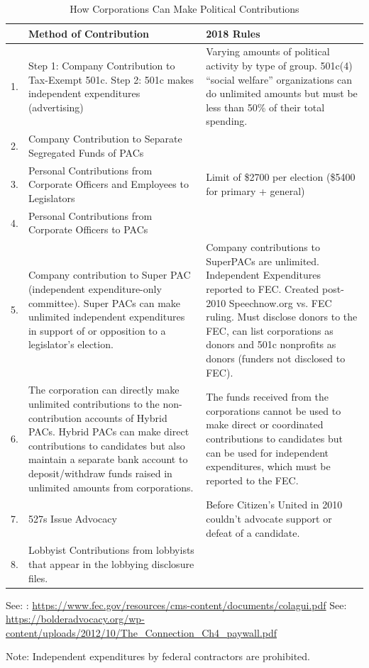 \begin{table}
\caption{How Corporations Can Make Political Contributions}
\begin{center}
\begin{tabular}[ht!]{|l|p{5cm}|p{5cm}|}
\hline
& Method of Contribution & 2018 Rules \\
\hline
1. & Step 1: Company Contribution to Tax-Exempt 501c. Step 2:  501c makes independent expenditures (advertising) & Varying amounts of political activity by type of group.  501c(4) ``social welfare'' organizations can do unlimited amounts but must be less than 50\% of their total spending. \\ \hline
2. & Company Contribution to Separate Segregated Funds of PACs& \\  \hline
3. & Personal Contributions from Corporate Officers and Employees to Legislators& Limit of \$2700 per election (\$5400 for primary + general)\\  \hline
4. & Personal Contributions from Corporate Officers to PACs&\\  \hline
5. &Company contribution to Super PAC (independent expenditure-only committee). Super PACs can make unlimited independent expenditures in support of or opposition to a legislator's election.& Company contributions to SuperPACs are unlimited. Independent Expenditures reported to FEC. Created post-2010 Speechnow.org vs. FEC ruling. Must disclose donors to the FEC, can list corporations as donors and 501c nonprofits as donors (funders not disclosed to FEC).\\  \hline
6.&The corporation can directly make unlimited contributions to the non-contribution accounts of Hybrid PACs.  Hybrid PACs can make direct contributions to candidates but also maintain a separate bank account to deposit/withdraw funds raised in unlimited amounts from corporations.   &The funds received from the corporations cannot be used to make direct or coordinated contributions to candidates but can be used for independent expenditures, which must be reported to the FEC.\\  \hline
7. & 527s Issue Advocacy& Before Citizen's United in 2010 couldn't advocate support or defeat of a candidate.\\  \hline
8.& Lobbyist Contributions from lobbyists that appear in the lobbying disclosure files.& \\ \hline
\hline
\end{tabular}
\end{center}
\end{table}


See: \citet{FEC2018}: \url{https://www.fec.gov/resources/cms-content/documents/colagui.pdf}
See: \url{https://bolderadvocacy.org/wp-content/uploads/2012/10/The_Connection_Ch4_paywall.pdf}

Note: Independent expenditures by federal contractors are prohibited.  
